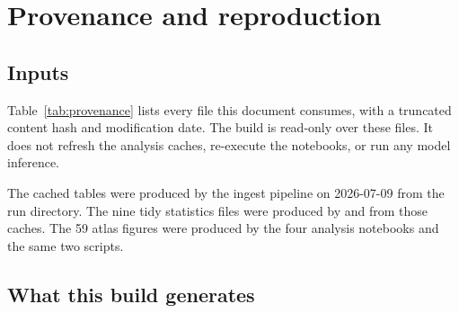 \section{Provenance and reproduction}
\label{app:provenance}

\subsection{Inputs}

Table~\ref{tab:provenance} lists every file this document consumes, with a truncated
content hash and modification date. The build is read-only over these files. It does not
refresh the analysis caches, re-execute the notebooks, or run any model inference.


The cached tables were produced by the ingest pipeline on 2026-07-09 from the
 run directory. The nine tidy statistics files were produced by
 and
 from those caches. The 59 atlas figures
were produced by the four analysis notebooks and the same two scripts.

\subsection{What this build generates}

